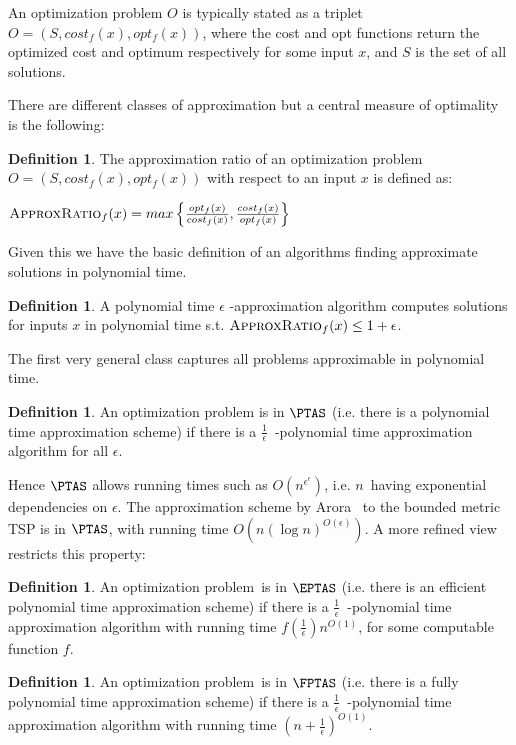 \documentclass[a4paper,11pt]{report}
\theoremstyle{plain}
\theoremstyle{definition}
\newtheorem{defn}[thm]{Definition} %
\begin{document}
An optimization problem $O$ is typically stated as a triplet $O = (S, cost_f(x), opt_f(x))$,
where the cost and opt functions return the optimized cost and optimum respectively for some input $x$, and $S$ is the set of all solutions.

There are different classes of approximation but a central measure of optimality is the following:

\begin{defn}
The approximation ratio of an optimization problem $O = (S, cost_f(x), opt_f(x))$ with respect to an input $x$ is defined as:

$\textsc{ApproxRatio}_f(x) = max \left\{ \frac{opt_f(x)}{cost_f(x)}, \frac{cost_f(x)}{opt_f(x)} \right\}$
\end{defn}

Given this we have the basic definition of an algorithms finding approximate solutions in polynomial time.

\begin{defn}
A polynomial time $\epsilon$ -approximation algorithm computes solutions for inputs $x$ in polynomial time s.t. $\textsc{ApproxRatio}_f(x) \leq 1 + \epsilon$.
\end{defn}

The first very general class captures all problems approximable in polynomial time.

\begin{defn}
An optimization problem is in $\PTAS$ (i.e. there is a polynomial time approximation scheme) if there is a $\frac{1}{\epsilon}$ -polynomial time approximation algorithm for all $\epsilon$.
\end{defn}

Hence $\PTAS$ allows running times such as $O(n^{\epsilon ^ \epsilon})$, i.e. $n$ having exponential dependencies on $\epsilon$.
The approximation scheme by Arora~\cite{ARORA96} to the bounded metric TSP is in $\PTAS$, with running time $O(n(\log n)^{O(\epsilon)})$.
A more refined view restricts this property:

\begin{defn}
An optimization problem is in $\EPTAS$ (i.e. there is an efficient polynomial time approximation scheme) if there is a $\frac{1}{\epsilon}$ -polynomial time approximation algorithm with 
running time $f(\frac{1}{\epsilon}) n^{O(1)}$, for some computable function $f$.
\end{defn}

\begin{defn}
An optimization problem is in $\FPTAS$ (i.e. there is a fully polynomial time approximation scheme) if there is a $\frac{1}{\epsilon}$ -polynomial time approximation algorithm with 
running time $(n + \frac{1}{\epsilon})^{O(1)}$.
\end{defn}
\end{document}
